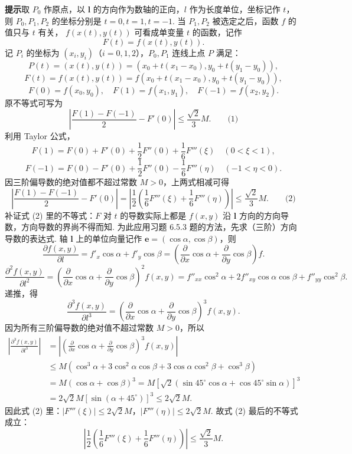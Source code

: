 \documentclass[UTF8,12pt,a4paper,fontset=fandol]{ctexart}
\begin{document}
\noindent\textbf{提示}\quad 取 $P_0$ 作原点，以 $\mathbf l$ 的方向作为数轴的正向，$l$ 作为长度单位，坐标记作 $t$，则 $P_0,P_1,P_2$ 的坐标分别是
$t=0,t=1,t=-1$. 当 $P_1,P_2$ 被选定之后，函数 $f$ 的值只与 $t$ 有关，
$f(x(t),y(t))$ 可看成单变量 $t$ 的函数，记作
\[
  F(t)=f(x(t),y(t)).
\]
记 $P_i$ 的坐标为 $(x_i,y_i)$（$i=0,1,2$），$P_0,P_1$ 连线上点 $P$ 满足：
\[
  P(t)=(x(t),y(t))=(x_0+t(x_1-x_0),y_0+t(y_1-y_0)),
\]
\[
  F(t)=f(x(t),y(t))
  =
  f(x_0+t(x_1-x_0),y_0+t(y_1-y_0)),
\]
\[
  F(0)=f(x_0,y_0),\quad F(1)=f(x_1,y_1),\quad F(-1)=f(x_2,y_2).
\]
原不等式可写为
\[
  \left|\frac{F(1)-F(-1)}2-F'(0)\right|
  \le\frac{\sqrt2}{3}M. \qquad\text{(1)}
\]
利用 Taylor 公式，
\[
  F(1)=F(0)+F'(0)+\frac12F''(0)+\frac16F'''(\xi)\quad(0<\xi<1),
\]
\[
  F(-1)=F(0)-F'(0)+\frac12F''(0)-\frac16F'''(\eta)\quad(-1<\eta<0).
\]
因三阶偏导数的绝对值都不超过常数 $M>0$，上两式相减可得
\[
\left|
\frac{F(1)-F(-1)}2-F'(0)
\right|
=
\left|
\frac12\left(\frac16F'''(\xi)+\frac16F'''(\eta)\right)
\right|
\le\frac{\sqrt2}{3}M. \qquad\text{(2)}
\]
补证式 (2) 里的不等式：$F$ 对 $t$ 的导数实际上都是 $f(x,y)$ 沿 $\mathbf l$ 方向的方向导数，方向导数的界尚不得而知. 为此应用习题 6.5.3 题的方法，先求（三阶）方向导数的表达式. 轴 $\mathbf l$ 上的单位向量记作
$\mathbf e=(\cos\alpha,\cos\beta)$，则
\[
\frac{\partial f(x,y)}{\partial l}
=f'_x\cos\alpha+f'_y\cos\beta
=\left(\frac{\partial}{\partial x}\cos\alpha+\frac{\partial}{\partial y}\cos\beta\right)f.
\]
\[
\frac{\partial^2f(x,y)}{\partial l^2}
=
\left(\frac{\partial}{\partial x}\cos\alpha+\frac{\partial}{\partial y}\cos\beta\right)^2f(x,y)
=f''_{xx}\cos^2\alpha+2f''_{xy}\cos\alpha\cos\beta+f''_{yy}\cos^2\beta.
\]
递推，得
\[
  \frac{\partial^3f(x,y)}{\partial l^3}
  =
  \left(\frac{\partial}{\partial x}\cos\alpha+\frac{\partial}{\partial y}\cos\beta\right)^3f(x,y).
\]
因为所有三阶偏导数的绝对值不超过常数 $M>0$，所以
\[
\begin{aligned}
\left|\frac{\partial^3f(x,y)}{\partial l^3}\right|
&=
\left|
\left(\frac{\partial}{\partial x}\cos\alpha+\frac{\partial}{\partial y}\cos\beta\right)^3f(x,y)
\right|\\
&\le M(\cos^3\alpha+3\cos^2\alpha\cos\beta
  +3\cos\alpha\cos^2\beta+\cos^3\beta)\\
&=M(\cos\alpha+\cos\beta)^3
=M[\sqrt2(\sin45^\circ\cos\alpha+\cos45^\circ\sin\alpha)]^3\\
&=2\sqrt2M[\sin(\alpha+45^\circ)]^3\le2\sqrt2M.
\end{aligned}
\]
因此式 (2) 里：$|F'''(\xi)|\le2\sqrt2M$，$|F'''(\eta)|\le2\sqrt2M$. 故式 (2) 最后的不等式成立：
\[
  \left|\frac12\left(\frac16F'''(\xi)+\frac16F'''(\eta)\right)\right|
  \le\frac{\sqrt2}{3}M.
\]
\end{document}
